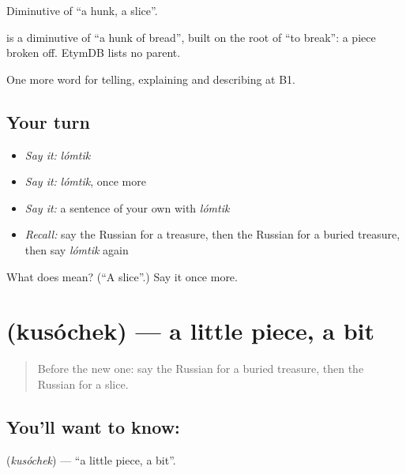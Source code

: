 Diminutive of \emph{} \textquotedblleft{}a hunk, a slice\textquotedblright{}.

\begin{cousinweb}
\emph{} is a diminutive of \emph{} \textquotedblleft{}a hunk of bread\textquotedblright{}, built on the root of \emph{} \textquotedblleft{}to break\textquotedblright{}: a piece broken off. EtymDB lists no parent.
\end{cousinweb}

\begin{grammarlens}[title={What you've built}]
One more word for telling, explaining and describing at B1.
\end{grammarlens}

\subsection*{Your turn}
\begin{itemize}
\raggedright
  \item \emph{Say it:} \emph{lómtik}
  \item \emph{Say it:} \emph{lómtik}, once more
  \item \emph{Say it:} a sentence of your own with \emph{lómtik}
  \item \emph{Recall:} say the Russian for a treasure, then the Russian for a buried treasure, then say \emph{lómtik} again
\end{itemize}

\begin{tcolorbox}[breakable,colback=teal!4,colframe=teal!35!black,title={Before you move on}]
What does  mean? (\textquotedblleft{}A slice\textquotedblright{}.) Say it once more.
\end{tcolorbox}
\section[\texorpdfstring{\ru{кусочек} (kusóchek)}{кусочек (kusóchek)}]{ (kusóchek) — a little piece, a bit}

\label{lesson:RU-C328-kusochek}



\begin{quote}
Before the new one: say the Russian for a buried treasure, then the Russian for a slice.
\end{quote}

\subsection*{You'll want to know: }
\textbf{} (\emph{kusóchek}) — \textquotedblleft{}a little piece, a bit\textquotedblright{}.

